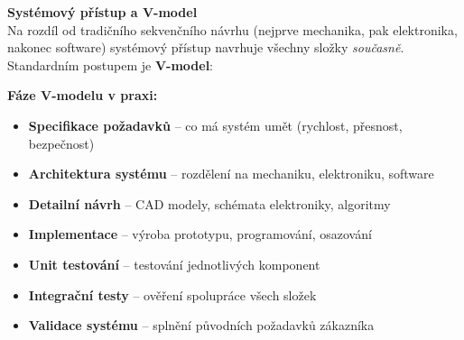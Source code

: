 \documentclass[a4paper,10pt]{article}
\begin{document}
\begin{vysvetlenibox}
\textbf{Systémový přístup a V-model}\\
Na rozdíl od tradičního sekvenčního návrhu (nejprve mechanika, pak elektronika,
nakonec software) systémový přístup navrhuje všechny složky \textit{současně}.
Standardním postupem je \textbf{V-model}:

\vspace{4pt}
\begin{center}
\end{center}

\textbf{Fáze V-modelu v praxi:}
\begin{itemize}[noitemsep, leftmargin=1.4em, topsep=4pt]
    \item \textbf{Specifikace požadavků} -- co má systém umět (rychlost, přesnost, bezpečnost)
    \item \textbf{Architektura systému} -- rozdělení na mechaniku, elektroniku, software
    \item \textbf{Detailní návrh} -- CAD modely, schémata elektroniky, algoritmy
    \item \textbf{Implementace} -- výroba prototypu, programování, osazování
    \item \textbf{Unit testování} -- testování jednotlivých komponent
    \item \textbf{Integrační testy} -- ověření spolupráce všech složek
    \item \textbf{Validace systému} -- splnění původních požadavků zákazníka
\end{itemize}


\end{vysvetlenibox}
\end{document}
